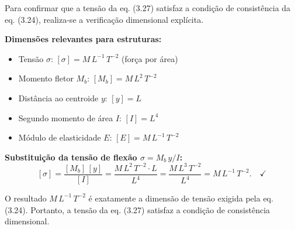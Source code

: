 Para confirmar que a tensão da eq. (3.27) satisfaz a condição de consistência da eq. (3.24), realiza-se a verificação dimensional explícita.

\textbf{Dimensões relevantes para estruturas:}
\begin{itemize}
\item Tensão $\sigma$: $[\sigma] = M\,L^{-1}\,T^{-2}$ (força por área)
\item Momento fletor $M_b$: $[M_b] = M\,L^{2}\,T^{-2}$
\item Distância ao centroide $y$: $[y] = L$
\item Segundo momento de área $I$: $[I] = L^{4}$
\item Módulo de elasticidade $E$: $[E] = M\,L^{-1}\,T^{-2}$
\end{itemize}

\textbf{Substituição da tensão de flexão $\sigma = M_b\,y/I$:}
\[
[\sigma] = \frac{[M_b]\,[y]}{[I]} = \frac{M\,L^{2}\,T^{-2}\cdot L}{L^{4}} = \frac{M\,L^{3}\,T^{-2}}{L^{4}} = M\,L^{-1}\,T^{-2}.\quad\checkmark
\]

O resultado $M\,L^{-1}\,T^{-2}$ é exatamente a dimensão de tensão exigida pela eq. (3.24). Portanto, a tensão da eq. (3.27) satisfaz a condição de consistência dimensional.

